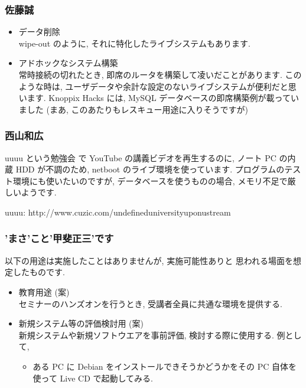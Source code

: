 \documentclass[cjk,dvipdfmx,12pt,%
hyperref={bookmarks=true,bookmarksnumbered=true,bookmarksopen=false,%
colorlinks=false,%
pdftitle={第40回 関西Debian勉強会},%
pdfauthor={倉敷・のがた・佐々木},%
pdfsubject={資料},%
}]{beamer}
\begin{document}
\begin{frame}[fragile]
\frametitle{ 佐藤誠 }


    \begin{itemize}
          \item データ削除　\\
        wipe-out のように, それに特化したライブシステムもあります.
          \item アドホックなシステム構築　\\
常時接続の切れたとき, 即席のルータを構築して凌いだことがあります.
このような時は, ユーザデータや余計な設定のないライブシステムが便利だと思います.
Knoppix Hacks には, MySQL データベースの即席構築例が載っていました
(まあ, このあたりもレスキュー用途に入りそうですが)
    \end{itemize}


\end{frame}



\begin{frame}[fragile]
\frametitle{ 西山和広 }


    uuuu という勉強会
    で YouTube の講義ビデオを再生するのに, ノート PC の内蔵 HDD が不調のため, netboot のライブ環境を使っています.
    プログラムのテスト環境にも使いたいのですが, データベースを使うものの場合, メモリ不足で厳しいようです.

        uuuu: http://www.cuzic.com/undefineduniversityuponustream


\end{frame}



\begin{frame}[fragile]
\frametitle{ 'まさ'こと'甲斐正三'です }


以下の用途は実施したことはありませんが, 実施可能性ありと
思われる場面を想定したものです.
\begin{itemize}
      \item 教育用途 (案)　\\
    セミナーのハンズオンを行うとき, 受講者全員に共通な環境を提供する.
      \item 新規システム等の評価検討用 (案)　\\
    新規システムや新規ソフトウエアを事前評価,
    検討する際に使用する.
    例として,
    \begin{itemize}
          \item ある PC に Debian をインストールできそうかどうかをその PC 自体を使って Live CD で起動してみる.
    \end{itemize}
\end{itemize}


\end{frame}
\end{document}
